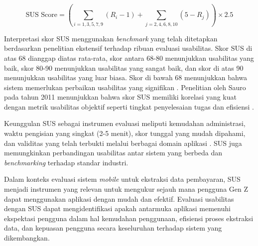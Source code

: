 \begin{equation}
    \label{eq:sus-score}
\text{SUS Score} = \left(\sum_{i=1,3,5,7,9} (R_i - 1) + \sum_{j=2,4,6,8,10} (5 - R_j)\right) \times 2.5
\end{equation}

Interpretasi skor SUS menggunakan \emph{benchmark} yang telah ditetapkan berdasarkan penelitian ekstensif terhadap ribuan evaluasi usabilitas. Skor SUS di atas 68 dianggap diatas rata-rata, skor antara 68-80 menunjukkan usabilitas yang baik, skor 80-90 menunjukkan usabilitas yang sangat baik, dan skor di atas 90 menunjukkan usabilitas yang luar biasa. Skor di bawah 68 menunjukkan bahwa sistem memerlukan perbaikan usabilitas yang signifikan \parencite{bangor2009determining}. Penelitian oleh Sauro pada tahun 2011 menunjukkan bahwa skor SUS memiliki korelasi yang kuat dengan metrik usabilitas objektif seperti tingkat penyelesaian tugas dan efisiensi \parencite{sauro2011measuring}.

Keunggulan SUS sebagai instrumen evaluasi meliputi kemudahan administrasi, waktu pengisian yang singkat (2-5 menit), skor tunggal yang mudah dipahami, dan validitas yang telah terbukti melalui berbagai domain aplikasi \parencite{lewis2018sus}. SUS juga memungkinkan perbandingan usabilitas antar sistem yang berbeda dan \emph{benchmarking} terhadap standar industri.

Dalam konteks evaluasi sistem \emph{mobile} untuk ekstraksi data pembayaran, SUS menjadi instrumen yang relevan untuk mengukur sejauh mana pengguna Gen Z dapat menggunakan aplikasi dengan mudah dan efektif. Evaluasi usabilitas dengan SUS dapat mengidentifikasi apakah antarmuka aplikasi memenuhi ekspektasi pengguna dalam hal kemudahan penggunaan, efisiensi proses ekstraksi data, dan kepuasan pengguna secara keseluruhan terhadap sistem yang dikembangkan.

